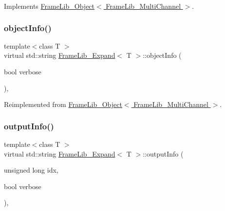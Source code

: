Implements \hyperlink{class_frame_lib___object_ab1ab1ae8180bb8b7e881aac6a4e1066c}{Frame\+Lib\+\_\+\+Object$<$ Frame\+Lib\+\_\+\+Multi\+Channel $>$}.

\mbox{\label{class_frame_lib___expand_ac4527eab2bfb55a38bd796d95f2a2562}} 
\subsubsection{\texorpdfstring{object\+Info()}{objectInfo()}}
{\footnotesize\ttfamily template$<$class T $>$ \\
virtual std\+::string \hyperlink{class_frame_lib___expand}{Frame\+Lib\+\_\+\+Expand}$<$ T $>$\+::object\+Info (\begin{DoxyParamCaption}\item[{bool}]{verbose }\end{DoxyParamCaption})\hspace{0.3cm}{\ttfamily [inline]}, {\ttfamily [virtual]}}



Reimplemented from \hyperlink{class_frame_lib___object_a10d673de9a3c59ace6a22ba1cff313c8}{Frame\+Lib\+\_\+\+Object$<$ Frame\+Lib\+\_\+\+Multi\+Channel $>$}.

\mbox{\label{class_frame_lib___expand_abba12bed97c0b76095f1e1a699591b3e}} 
\subsubsection{\texorpdfstring{output\+Info()}{outputInfo()}}
{\footnotesize\ttfamily template$<$class T $>$ \\
virtual std\+::string \hyperlink{class_frame_lib___expand}{Frame\+Lib\+\_\+\+Expand}$<$ T $>$\+::output\+Info (\begin{DoxyParamCaption}\item[{unsigned long}]{idx,  }\item[{bool}]{verbose }\end{DoxyParamCaption})\hspace{0.3cm}{\ttfamily [inline]}, {\ttfamily [virtual]}}



